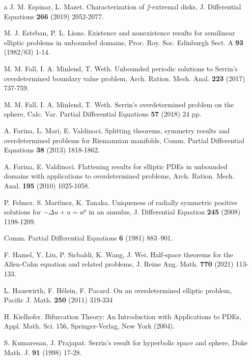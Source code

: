 \documentclass[reqno]{amsart}
\numberwithin{equation}{section}
\newenvironment{key words}{\textbf{Keywords}\mbox{  }}{ }
\begin{document}
\begin{thebibliography}{a}
 J. M. Espinar, L. Mazet. Characterization of $f$-extremal disks, J. Differential Equations {\bf 266} (2019) 2052-2077.

M. J. Esteban, P. L. Lions.
Existence and nonexistence results for semilinear elliptic problems in unbounded domains, Proc. Roy. Soc. Edinburgh Sect. A {\bf 93} (1982/83) 1-14.

 M. M. Fall, I. A. Minlend, T. Weth. Unbounded periodic solutions to Serrin's overdetermined boundary value problem, Arch. Ration. Mech. Anal. {\bf 223} (2017) 737-759.

 M. M. Fall, I. A. Minlend, T. Weth. Serrin's overdetermined problem on the sphere, Calc. Var. Partial Differential Equations {\bf 57} (2018) 24 pp.

 A. Farina, L. Mari, E. Valdinoci. Splitting theorems, symmetry results and overdetermined problems for Riemannian manifolds, Comm. Partial Differential Equations {\bf 38} (2013) 1818-1862.

 A. Farina, E. Valdinoci. Flattening results for elliptic PDEs in unbounded domains with applications to overdetermined problems, Arch. Ration. Mech. Anal. {\bf 195} (2010) 1025-1058.

 P. Felmer, S. Mart\'{\i}nez, K. Tanaka.  Uniqueness of radially symmetric positive solutions
	for $-\Delta u +u = u^p$ in an annulus, J. Differential Equation {\bf 245} (2008) 1198-1209.
	
 {Comm.
Partial Differential Equations {\bf 6} (1981) 883–901.}
	
 F. Hamel, Y. Liu, P. Sicbaldi, K. Wang, J. Wei. Half-space theorems for the Allen-Cahn
equation and related problems, J. Reine Ang. Math. {\bf 770} (2021) 113-133.

 L. Hauswirth, F. H\'{e}lein, F. Pacard. On an overdetermined elliptic problem, Pacific J. Math. {\bf 250} (2011) 319-334

 H. Kielhofer. Bifurcation Theory: An Introduction with Applications to PDEs, Appl. Math. Sci. 156, Springer-Verlag, New York (2004).

 S. Kumaresan, J. Prajapat. Serrin's result for hyperbolic space and sphere, Duke Math. J. {\bf 91} (1998) 17-28.


\end{thebibliography}
\end{document}
